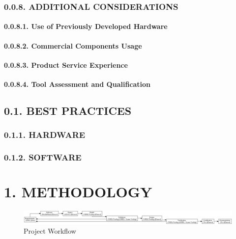 \documentclass[]{article}
\let\oldparagraph\paragraph
\renewcommand{\paragraph}[1]{\oldparagraph{#1}\mbox{}}
\begin{document}
\subsubsection{0.0.8. ADDITIONAL
CONSIDERATIONS}\label{additional-considerations}

\paragraph{0.0.8.1. Use of Previously Developed
Hardware}\label{use-of-previously-developed-hardware}

\paragraph{0.0.8.2. Commercial Components
Usage}\label{commercial-components-usage}

\paragraph{0.0.8.3. Product Service
Experience}\label{product-service-experience}

\paragraph{0.0.8.4. Tool Assessment and
Qualification}\label{tool-assessment-and-qualification}

\subsection{0.1. BEST PRACTICES}\label{best-practices}

\subsubsection{0.1.1. HARDWARE}\label{hardware}

\subsubsection{0.1.2. SOFTWARE}\label{software}

\section{1. METHODOLOGY}\label{methodology}

\begin{figure}
\centering
\includegraphics{../doc/project.png}
\caption{Project Workflow}
\end{figure}
\end{document}
